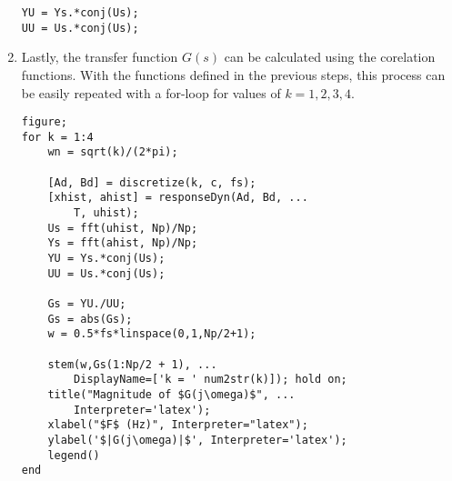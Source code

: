 \documentclass{article}
\begin{document}
\begin{enumerate}
    \begin{lstlisting}[style=Matlab-editor]
YU = Ys.*conj(Us);
UU = Us.*conj(Us);
    \end{lstlisting}

    \item Lastly, the transfer function $G(s)$ can be calculated using the corelation functions. With the functions defined in the previous steps, this process can be easily repeated with a for-loop for values of $k=1,2,3,4$. 

    \begin{lstlisting}[style=Matlab-editor]
figure;
for k = 1:4
    wn = sqrt(k)/(2*pi); 

    [Ad, Bd] = discretize(k, c, fs);
    [xhist, ahist] = responseDyn(Ad, Bd, ...
        T, uhist);
    Us = fft(uhist, Np)/Np;
    Ys = fft(ahist, Np)/Np;
    YU = Ys.*conj(Us);
    UU = Us.*conj(Us);

    Gs = YU./UU;
    Gs = abs(Gs);
    w = 0.5*fs*linspace(0,1,Np/2+1);

    stem(w,Gs(1:Np/2 + 1), ...
        DisplayName=['k = ' num2str(k)]); hold on;
    title("Magnitude of $G(j\omega)$", ...
        Interpreter='latex');
    xlabel("$F$ (Hz)", Interpreter="latex");
    ylabel('$|G(j\omega)|$', Interpreter='latex');
    legend()
end
    \end{lstlisting}
\end{enumerate}
\end{document}

